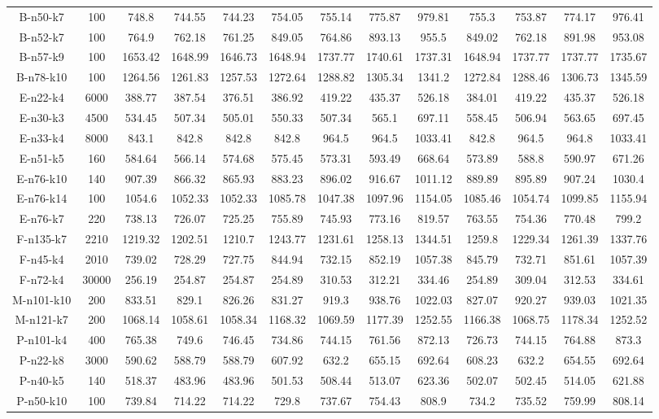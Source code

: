 \documentclass[11pt]{article} %
\begin{document}
\begin{enumerate}
\begin{landscape}
\begin{table}[p]
\begin{small}
\begin{tabular}{ccccccccccccc}
B-n50-k7&100&748.8&744.55&744.23&754.05&755.14&775.87&979.81&755.3&753.87&774.17&976.41\\
B-n52-k7&100&764.9&762.18&761.25&849.05&764.86&893.13&955.5&849.02&762.18&891.98&953.08\\
B-n57-k9&100&1653.42&1648.99&1646.73&1648.94&1737.77&1740.61&1737.31&1648.94&1737.77&1737.77&1735.67\\
B-n78-k10&100&1264.56&1261.83&1257.53&1272.64&1288.82&1305.34&1341.2&1272.84&1288.46&1306.73&1345.59\\
E-n22-k4&6000&388.77&387.54&376.51&386.92&419.22&435.37&526.18&384.01&419.22&435.37&526.18\\
E-n30-k3&4500&534.45&507.34&505.01&550.33&507.34&565.1&697.11&558.45&506.94&563.65&697.45\\
E-n33-k4&8000&843.1&842.8&842.8&842.8&964.5&964.5&1033.41&842.8&964.5&964.8&1033.41\\
E-n51-k5&160&584.64&566.14&574.68&575.45&573.31&593.49&668.64&573.89&588.8&590.97&671.26\\
E-n76-k10&140&907.39&866.32&865.93&883.23&896.02&916.67&1011.12&889.89&895.89&907.24&1030.4\\
E-n76-k14&100&1054.6&1052.33&1052.33&1085.78&1047.38&1097.96&1154.05&1085.46&1054.74&1099.85&1155.94\\
E-n76-k7&220&738.13&726.07&725.25&755.89&745.93&773.16&819.57&763.55&754.36&770.48&799.2\\
F-n135-k7&2210&1219.32&1202.51&1210.7&1243.77&1231.61&1258.13&1344.51&1259.8&1229.34&1261.39&1337.76\\
F-n45-k4&2010&739.02&728.29&727.75&844.94&732.15&852.19&1057.38&845.79&732.71&851.61&1057.39\\
F-n72-k4&30000&256.19&254.87&254.87&254.89&310.53&312.21&334.46&254.89&309.04&312.53&334.61\\
M-n101-k10&200&833.51&829.1&826.26&831.27&919.3&938.76&1022.03&827.07&920.27&939.03&1021.35\\
M-n121-k7&200&1068.14&1058.61&1058.34&1168.32&1069.59&1177.39&1252.55&1166.38&1068.75&1178.34&1252.52\\
P-n101-k4&400&765.38&749.6&746.45&734.86&744.15&761.56&872.13&726.73&744.15&764.88&873.3\\
P-n22-k8&3000&590.62&588.79&588.79&607.92&632.2&655.15&692.64&608.23&632.2&654.55&692.64\\
P-n40-k5&140&518.37&483.96&483.96&501.53&508.44&513.07&623.36&502.07&502.45&514.05&621.88\\
P-n50-k10&100&739.84&714.22&714.22&729.8&737.67&754.43&808.9&734.2&735.52&759.99&808.14\\

\end{tabular}
\end{small}
\end{table}
\end{landscape}
\end{enumerate}
\end{document}
